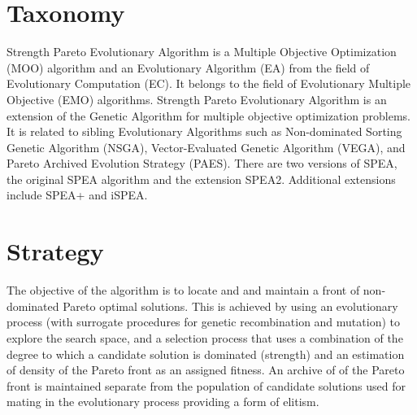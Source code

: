 \documentclass[a4paper, 11pt]{article}
\begin{document}
\section{Taxonomy}
\label{sec:taxonomy}
Strength Pareto Evolutionary Algorithm is a Multiple Objective Optimization (MOO) algorithm and an Evolutionary Algorithm (EA) from the field of Evolutionary Computation (EC). It belongs to the field of Evolutionary Multiple Objective (EMO) algorithms.
Strength Pareto Evolutionary Algorithm is an extension of the Genetic Algorithm for multiple objective optimization problems.
It is related to sibling Evolutionary Algorithms such as Non-dominated Sorting Genetic Algorithm (NSGA), Vector-Evaluated Genetic Algorithm (VEGA), and Pareto Archived Evolution Strategy (PAES).
There are two versions of SPEA, the original SPEA algorithm and the extension SPEA2. Additional extensions include SPEA+ and iSPEA.

\section{Strategy}
\label{sec:strategy}
The objective of the algorithm is to locate and and maintain a front of non-dominated Pareto optimal solutions.
This is achieved by using an evolutionary process (with surrogate procedures for genetic recombination and mutation) to explore the search space, and a selection process that uses a combination of the degree to which a candidate solution is dominated (strength) and an estimation of density of the Pareto front as an assigned fitness. An archive of of the Pareto front is maintained separate from the population of candidate solutions used for mating in the evolutionary process providing a form of elitism.
\end{document}
